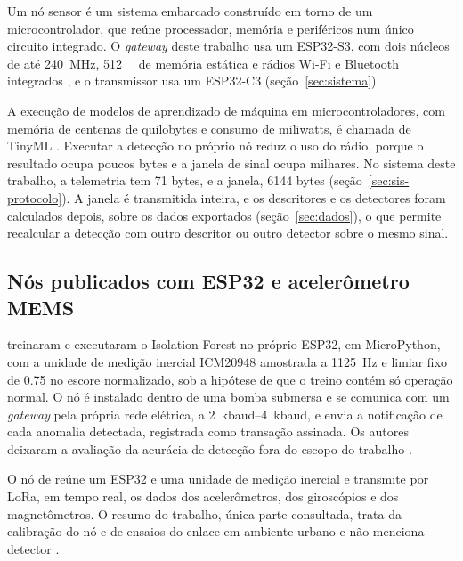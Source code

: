 Um nó sensor é um sistema embarcado construído em torno de um microcontrolador, que reúne processador, memória e periféricos num único circuito integrado. O \textit{gateway} deste trabalho usa um ESP32-S3, com dois núcleos de até \SI{240}{\mega\hertz}, \SI{512}{\kilo\byte} de memória estática e rádios Wi-Fi e Bluetooth integrados \cite{espressif2026}, e o transmissor usa um ESP32-C3 (seção~\ref{sec:sistema}).

A execução de modelos de aprendizado de máquina em microcontroladores, com memória de centenas de quilobytes e consumo de miliwatts, é chamada de TinyML \cite{antonini2023,barbariol2022}. Executar a detecção no próprio nó reduz o uso do rádio, porque o resultado ocupa poucos bytes e a janela de sinal ocupa milhares. No sistema deste trabalho, a telemetria tem \num{71} bytes, e a janela, \num{6144} bytes (seção~\ref{sec:sis-protocolo}). A janela é transmitida inteira, e os descritores e os detectores foram calculados depois, sobre os dados exportados (seção~\ref{sec:dados}), o que permite recalcular a detecção com outro descritor ou outro detector sobre o mesmo sinal.

\subsection{Nós publicados com ESP32 e acelerômetro MEMS}\label{sec:fund-nos-publicados}

 treinaram e executaram o Isolation Forest no próprio ESP32, em MicroPython, com a unidade de medição inercial ICM20948 amostrada a \SI{1125}{\hertz} e limiar fixo de \num{0,75} no escore normalizado, sob a hipótese de que o treino contém só operação normal. O nó é instalado dentro de uma bomba submersa e se comunica com um \textit{gateway} pela própria rede elétrica, a \SIrange{2}{4}{kbaud}, e envia a notificação de cada anomalia detectada, registrada como transação assinada. Os autores deixaram a avaliação da acurácia de detecção fora do escopo do trabalho \cite{antonini2023}.

O nó de  reúne um ESP32 e uma unidade de medição inercial e transmite por LoRa, em tempo real, os dados dos acelerômetros, dos giroscópios e dos magnetômetros. O resumo do trabalho, única parte consultada, trata da calibração do nó e de ensaios do enlace em ambiente urbano e não menciona detector \cite{bisio2025}.

